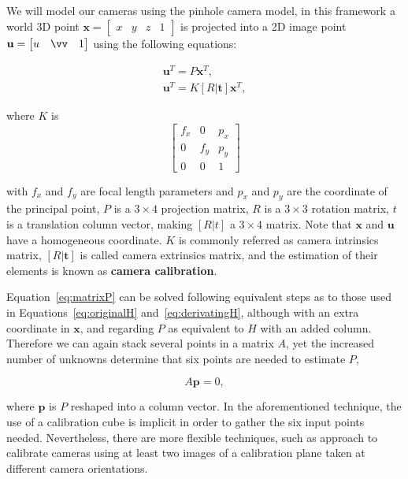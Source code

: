 \documentclass[12pt]{article}
\begin{document}
We will model our cameras using the pinhole camera model, in this framework a world 3D point $\mathbf{x} = \begin{bmatrix} x & y & z & 1 \end{bmatrix}$ is projected into a 2D image point $\mathbf{u} = \begin{bmatrix} u & \vv & 1 \end{bmatrix}$ using the following equations:

\begin{gather}
	\mathbf{u}^T = P \mathbf{x}^T, \label{eq:matrixP} \\
	\mathbf{u}^T = K [R | \mathbf{t}] \mathbf{x}^T, \label{eq:matrixRT}
\end{gather}

where $K$ is 
\begin{equation}
\begin{bmatrix}
f_x & 0 & p_x \\ 
0 & f_y & p_y \\ 
0 & 0 & 1
\end{bmatrix}
\end{equation}

with $f_x$ and $f_y$ are focal length parameters and $p_x$ and $p_y$ are the coordinate of the principal point, $P$ is a $3 \times 4$ projection matrix, $R$ is a $3 \times 3$ rotation matrix, $t$ is a translation column vector, making $[R|t]$ a $3 \times 4$ matrix.
Note that $\mathbf{x}$ and $\mathbf{u}$ have a homogeneous coordinate.
$K$ is commonly referred as camera intrinsics matrix, $[R|\mathbf{t}]$ is called camera extrinsics matrix, and the estimation of their elements is known as \textbf{camera calibration}.

Equation~\ref{eq:matrixP} can be solved following equivalent steps as to those used in Equations~\ref{eq:originalH} and~\ref{eq:derivatingH}, although with an extra coordinate in $\mathbf{x}$, and regarding $P$ as equivalent to $H$ with an added column.
Therefore we can again stack several points in a matrix $A$, yet the increased number of unknowns determine that six points are needed to estimate $P$,

\begin{equation}
A\mathbf{p} = 0,
\end{equation}

where $\mathbf{p}$ is $P$ reshaped into a column vector.
In the aforementioned technique, the use of a calibration cube is implicit in order to gather the six input points needed.
Nevertheless, there are more flexible techniques, such as \cite{Zhang2000} approach to calibrate cameras using at least two images of a calibration plane taken at different camera orientations.
\end{document}
